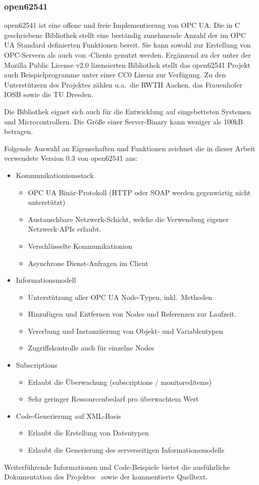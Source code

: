 \subsubsection{open62541%
        \label{sec:2-open62541}}
open62541 ist eine offene und freie Implementierung von OPC UA. 
Die in C geschriebene Bibliothek stellt eine beständig zunehmende Anzahl der im OPC UA Standard definierten
Funktionen bereit. Sie kann sowohl zur Erstellung von OPC-Servern als auch von -Clients
genutzt werden. Ergänzend zu der unter der Mozilla Public License v2.0 lizensierten
Bibliothek stellt das open62541 Projekt auch Beispielprogramme unter einer CC0 Lizenz
zur Verfügung.
Zu den Unterstützern des Projektes zählen u.a.\, die RWTH Aachen, das Frauenhofer IOSB sowie die TU Dresden.

Die Bibliothek eignet sich auch für die Entwicklung auf eingebetteten Systemen und
Microcontrollern. Die Größe einer Server-Binary kann weniger als 100kB betragen.

Folgende Auswahl an Eigenschaften und Funktionen zeichnet die in dieser Arbeit verwendete
Version 0.3 von open62541 aus:
\begin{itemize}
  \item Kommunikationionsstack
  \begin{itemize}
      \item OPC UA Binär-Protokoll (HTTP oder SOAP werden gegenwärtig nicht unterstützt)
      \item Austauschbare Netzwerk-Schicht, welche die Verwendung eigener Netzwerk-APIs
      erlaubt.
      \item Verschlüsselte Kommunikationion
      \item Asynchrone Dienst-Anfragen im Client
  \end{itemize}
  \item Informationsmodell
  \begin{itemize}
    \item Unterstützung aller OPC UA Node-Typen, inkl.~Methoden
    \item Hinzufügen und Entfernen von Nodes und Referenzen zur Laufzeit.
    \item Vererbung und Instanziierung von Objekt- und Variablentypen
    \item Zugriffskontrolle auch für einzelne Nodes
  \end{itemize}
  \item Subscriptions
  \begin{itemize}
    \item Erlaubt die Überwachung (subscriptions / monitoreditems)
    \item Sehr geringer Ressourcenbedarf pro überwachtem Wert
  \end{itemize}
  \item Code-Generierung auf XML-Basis
  \begin{itemize}
    \item Erlaubt die Erstellung von Datentypen
    \item Erlaubt die Generierung des serverseitigen Informationsmodells
  \end{itemize}
\end{itemize}

Weiterführende Informationen und Code-Beispiele bietet die ausführliche Dokumentation des Projektes~\citep[siehe]{web-open62541} sowie der kommentierte Quelltext.
